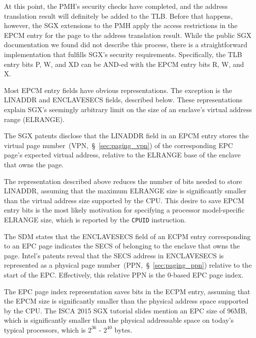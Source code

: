 At this point, the PMH's security checks have completed, and the address
translation result will definitely be added to the TLB. Before that happens,
however, the SGX extensions to the PMH apply the access restrictions in the
EPCM entry for the page to the address translation result. While the public SGX
documentation we found did not describe this process, there is a
straightforward implementation that fulfills SGX's security requirements.
Specifically, the TLB entry bits P, W, and XD can be AND-ed with the EPCM entry
bits R, W, and X.


\label{sec:sgx_epcm_format}


Most EPCM entry fields have obvious representations. The exception is the
LINADDR and ENCLAVESECS fields, described below. These representations explain
SGX's seemingly arbitrary limit on the size of an enclave's virtual address
range (ELRANGE).

The SGX patents disclose that the LINADDR field in an EPCM entry stores the
virtual page number~(VPN,~\S~\ref{sec:paging_vpn}) of the corresponding EPC
page's expected virtual address, relative to the ELRANGE base of the enclave
that owns the page.

The representation described above reduces the number of bits needed to store
LINADDR, assuming that the maximum ELRANGE size is significantly smaller than
the virtual address size supported by the CPU. This desire to save EPCM entry
bits is the most likely motivation for specifying a processor model-specific
ELRANGE size, which is reported by the \texttt{CPUID} instruction.

The SDM states that the ENCLAVESECS field of an ECPM entry corresponding to an
EPC page indicates the SECS of belonging to the enclave that owns the page.
Intel's patents reveal that the SECS address in ENCLAVESECS is represented as
a physical page number~(PPN,~\S~\ref{sec:paging_ppn}) relative to the start of
the EPC. Effectively, this relative PPN is the 0-based EPC page index.


The EPC page index representation saves bits in the ECPM entry, assuming that
the EPCM size is significantly smaller than the physical address space
supported by the CPU. The ISCA 2015 SGX tutorial slides mention an EPC size of
96MB, which is significantly smaller than the physical addressable space on
today's typical processors, which is $2^{36}$ - $2^{40}$ bytes.


